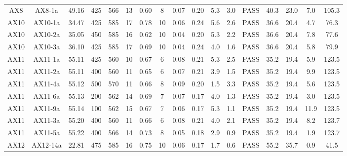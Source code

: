 \documentclass[9pt,twoside]{pnas-new}
\begin{document}
\begin{table}
\begin{tabular}{ccccccccccccccccc}
AX8  & AX8-1a   & 49.16     & 425       & 566       & 13 & 0.60 & 8     & 0.07    & 0.20    & 5.3            & 3.0             & PASS & 40.3       & 23.0          & 7.0      & 105.3         \\
AX10 & AX10-1a  & 34.47     & 425       & 585       & 17 & 0.78 & 10    & 0.06    & 0.24    & 5.6            & 2.6             & PASS & 36.6       & 20.4          & 4.7      & 76.3          \\
AX10 & AX10-2a  & 35.05     & 450       & 585       & 16 & 0.62 & 10    & 0.04    & 0.20    & 5.3            & 2.2             & PASS & 36.6       & 20.4          & 7.8      & 77.6          \\
AX10 & AX10-3a  & 36.10     & 425       & 585       & 17 & 0.69 & 10    & 0.04    & 0.24    & 4.0            & 1.6             & PASS & 36.6       & 20.4          & 5.8      & 79.9          \\
AX11 & AX11-1a  & 55.11     & 425       & 560       & 10 & 0.67 & 6     & 0.08    & 0.21    & 5.3            & 2.5             & PASS & 35.2       & 19.4          & 5.9      & 123.5         \\
AX11 & AX11-2a  & 55.11     & 400       & 560       & 11 & 0.65 & 6     & 0.07    & 0.21    & 3.9            & 1.5             & PASS & 35.2       & 19.4          & 9.9      & 123.5         \\
AX11 & AX11-4a  & 55.12     & 500       & 570       & 11 & 0.66 & 8     & 0.09    & 0.20    & 1.5            & 3.3             & PASS & 35.2       & 19.4          & 5.6      & 123.5         \\
AX11 & AX11-6a  & 55.13     & 200       & 562       & 14 & 0.69 & 7     & 0.07    & 0.17    & 4.0            & 1.3             & PASS & 35.2       & 19.4          & 3.0      & 123.5         \\
AX11 & AX11-9a  & 55.14     & 100       & 562       & 15 & 0.67 & 7     & 0.06    & 0.17    & 5.3            & 1.1             & PASS & 35.2       & 19.4          & 11.9     & 123.5         \\
AX11 & AX11-3a  & 55.20     & 400       & 560       & 11 & 0.66 & 6     & 0.08    & 0.21    & 4.0            & 2.1             & PASS & 35.2       & 19.4          & 8.2      & 123.7         \\
AX11 & AX11-5a  & 55.22     & 400       & 566       & 14 & 0.73 & 8     & 0.05    & 0.18    & 2.9            & 0.9             & PASS & 35.2       & 19.4          & 1.9      & 123.7         \\
AX12 & AX12-14a & 22.81     & 475       & 585       & 16 & 0.75 & 10    & 0.06    & 0.17    & 1.7            & 0.6             & PASS & 55.2       & 35.7          & 0.9      & 41.5          \\

\end{tabular}
\end{table}
\end{document}
